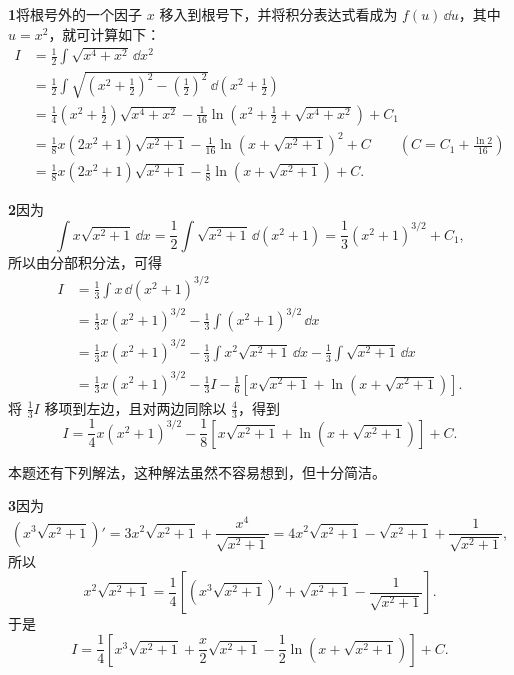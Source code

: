 \begin{xsolution}
\textbf{1}\quad 将根号外的一个因子 $x$ 移入到根号下，并将积分表达式看成为 $f(u)\,\dd u$，其中 $u=x^2$，就可计算如下：
\begin{align*}
  I
  &=\frac12\int\sqrt{x^4+x^2}\,\dd x^2\\
  &=\frac12\int\sqrt{\left(x^2+\frac12\right)^2-\left(\frac12\right)^2}\,\dd\left(x^2+\frac12\right)\\
  &=\frac14\left(x^2+\frac12\right)\sqrt{x^4+x^2}
    -\frac1{16}\ln\left(x^2+\frac12+\sqrt{x^4+x^2}\right)+C_1\\
  &=\frac18x(2x^2+1)\sqrt{x^2+1}
    -\frac1{16}\ln\left(x+\sqrt{x^2+1}\right)^2+C
    \qquad\left(C=C_1+\frac{\ln2}{16}\right)\\
  &=\frac18x(2x^2+1)\sqrt{x^2+1}
    -\frac18\ln\left(x+\sqrt{x^2+1}\right)+C.
\end{align*}
\end{xsolution}

\begin{xsolution}
\textbf{2}\quad 因为
\[
  \int x\sqrt{x^2+1}\,\dd x
    =\frac12\int\sqrt{x^2+1}\,\dd(x^2+1)
    =\frac13(x^2+1)^{3/2}+C_1,
\]
所以由分部积分法，可得
\begin{align*}
  I
  &=\frac13\int x\,\dd(x^2+1)^{3/2}\\
  &=\frac13x(x^2+1)^{3/2}-\frac13\int(x^2+1)^{3/2}\,\dd x\\
  &=\frac13x(x^2+1)^{3/2}-\frac13\int x^2\sqrt{x^2+1}\,\dd x
    -\frac13\int\sqrt{x^2+1}\,\dd x\\
  &=\frac13x(x^2+1)^{3/2}-\frac13I
    -\frac16\left[x\sqrt{x^2+1}+\ln\left(x+\sqrt{x^2+1}\right)\right].
\end{align*}
将 $\frac13I$ 移项到左边，且对两边同除以 $\frac43$，得到
\[
  I=\frac14x(x^2+1)^{3/2}
    -\frac18\left[x\sqrt{x^2+1}+\ln\left(x+\sqrt{x^2+1}\right)\right]+C.
\]
\end{xsolution}

本题还有下列解法，这种解法虽然不容易想到，但十分简洁。

\begin{xsolution}
\textbf{3}\quad 因为
\[
  \left(x^3\sqrt{x^2+1}\right)'
    =3x^2\sqrt{x^2+1}+\frac{x^4}{\sqrt{x^2+1}}
    =4x^2\sqrt{x^2+1}-\sqrt{x^2+1}+\frac1{\sqrt{x^2+1}},
\]
所以
\[
  x^2\sqrt{x^2+1}
    =\frac14\left[\left(x^3\sqrt{x^2+1}\right)'
      +\sqrt{x^2+1}-\frac1{\sqrt{x^2+1}}\right].
\]
于是
\[
  I=\frac14\left[x^3\sqrt{x^2+1}+\frac{x}{2}\sqrt{x^2+1}
    -\frac12\ln\left(x+\sqrt{x^2+1}\right)\right]+C.
\]
\end{xsolution}

